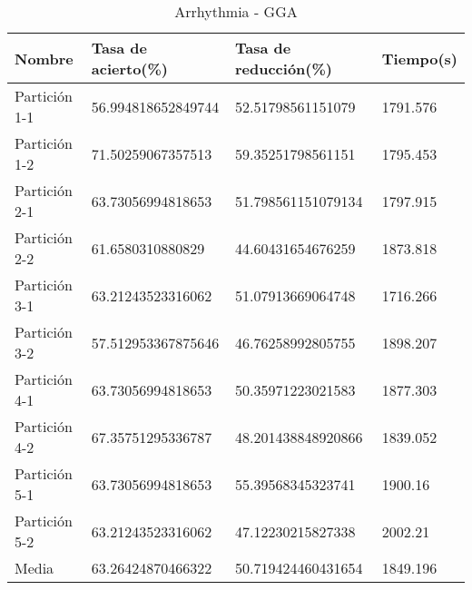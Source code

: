 \begin{table}[H]
	\centering
	\begin{tabular}{l|lll}
		Nombre        & Tasa de acierto(\%) & Tasa de reducción(\%) & Tiempo(s) \\ \hline
		Partición 1-1 & 56.994818652849744  & 52.51798561151079     & 1791.576  \\
		Partición 1-2 & 71.50259067357513   & 59.35251798561151     & 1795.453  \\
		Partición 2-1 & 63.73056994818653   & 51.798561151079134    & 1797.915  \\
		Partición 2-2 & 61.6580310880829    & 44.60431654676259     & 1873.818  \\
		Partición 3-1 & 63.21243523316062   & 51.07913669064748     & 1716.266  \\
		Partición 3-2 & 57.512953367875646  & 46.76258992805755     & 1898.207  \\
		Partición 4-1 & 63.73056994818653   & 50.35971223021583     & 1877.303  \\
		Partición 4-2 & 67.35751295336787   & 48.201438848920866    & 1839.052  \\
		Partición 5-1 & 63.73056994818653   & 55.39568345323741     & 1900.16   \\
		Partición 5-2 & 63.21243523316062   & 47.12230215827338     & 2002.21   \\ \hline
		Media         & 63.26424870466322   & 50.719424460431654    & 1849.196
	\end{tabular}
	\caption{Arrhythmia - GGA}
	\label{ARRH-GGA}
\end{table}